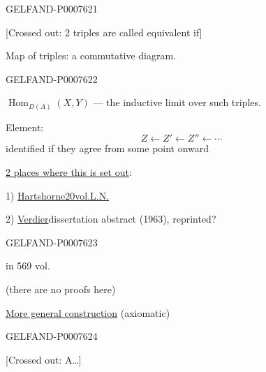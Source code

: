 \begin{GelfandAdjacentEvidence}{GELFAND-P000762}{1}

[Crossed out: 2 triples are called equivalent if]

Map of triples: a commutative diagram.
\end{GelfandAdjacentEvidence}
\begin{GelfandAdjacentEvidence}{GELFAND-P000762}{2}


\(\operatorname{Hom}_{D(A)}(X,Y)\) --- the inductive limit over such triples.

Element:
\[
Z\longleftarrow Z'\longleftarrow Z''\longleftarrow\cdots
\]
identified if they agree from some point onward

\underline{2 places where this is set out}:

1) \underline{Hartshorne}\qquad\underline{20}\quad\underline{vol.}\quad\underline{L.N.}


2) \underline{Verdier}\quad dissertation abstract (1963), reprinted?
\end{GelfandAdjacentEvidence}
\begin{GelfandAdjacentEvidence}{GELFAND-P000762}{3}

in 569 vol. 

(there are no proofs here)

\underline{More general construction} (axiomatic)
\end{GelfandAdjacentEvidence}
\begin{GelfandAdjacentEvidence}{GELFAND-P000762}{4}


[Crossed out: A…]
\end{GelfandAdjacentEvidence}
